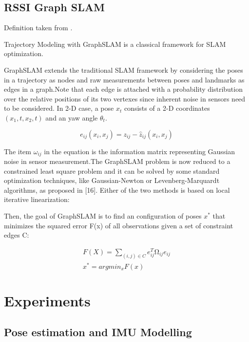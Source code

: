 

\subsection{RSSI Graph SLAM}

Definition taken from \cite{7809951}.

Trajectory Modeling with GraphSLAM\cite{SLAM_using_Gaussian_process_latent_variable_models}   is   a   classical   framework   for SLAM optimization.

GraphSLAM  extends  the  traditional  SLAM  framework  by considering  the  poses  in  a  trajectory  as  nodes  and  raw  measurements between poses and landmarks as edges in a graph.Note that each edge is attached with a probability distribution over  the  relative  positions  of  its  two  vertexes  since  inherent noise in sensors need to be considered. In 2-D case, a pose $x_t$ consists of a 2-D coordinates $(x_1,t,x_2,t)$ and an yaw angle $\theta_t$.

\begin{equation}
e_{i j}(x_i, x_j) = z_{i j} - \hat z_{i j} (x_i,x_j)
\end{equation}

The item $\omega_{i j}$ in the equation is the information matrix representing Gaussian noise in sensor measurement.The GraphSLAM problem is now reduced to a constrained least  square  problem  and  it  can  be  solved  by  some  standard optimization techniques, like Gaussian-Newton or Levenberg-Marquardt algorithms, as proposed in [16]. Either of the two methods is based on local iterative linearization: 

Then,  the  goal  of  GraphSLAM  is  to  find  an  configuration of  poses $x^{*}$ that  minimizes  the  squared  error F(x) of  all observations given a set of constraint edges C:

\begin{align}
F(X) =\sum_{(i,j)\in C} e_{i j}^T Ω_{ i j} e_{i j} \\
x^{*} = argmin_x F(x)
\end{align}


\section{Experiments}

\subsection{Pose estimation and IMU Modelling}

